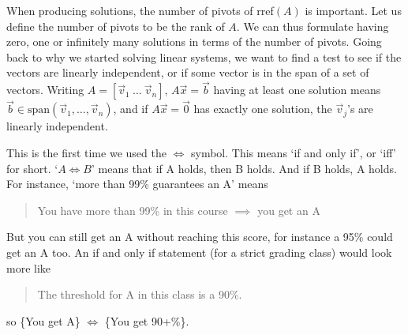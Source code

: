 When producing solutions, the number of pivots of rref$(A)$ is important. Let us define the number of pivots to be the rank of $A$. 
We can thus formulate having zero, one or infinitely many solutions in terms of the number of pivots.
Going back to why we started solving linear systems, we want to find a test to see if the vectors are linearly independent, or if some vector is in the span of a set of vectors.
Writing $A=[\vec{v}_1 \ \ldots \ \vec{v}_n]$, $A\vec{x}=\vec{b}$ having at least one solution means $\vec{b}\in\textrm{span}(\vec{v}_1,\ldots,\vec{v}_n)$,
and if $A\vec{x}=\vec{0}$ has exactly one solution, the $\vec{v}_j$'s are linearly independent.
\begin{remark}
	This is the first time we used the $\iff$ symbol. This means `if and only if', or `iff' for short.
	`$A\iff B$' means that if A holds, then B holds. And if B holds, A holds. 
	For instance, `more than 99\% guarantees an A' means \begin{quotation}
		You have more than 99\% in this course $\implies$ you get an A
	\end{quotation}
	But you can still get an A without reaching this score, for instance a 95\% could get an A too.
	An if and only if statement (for a strict grading class) would look more like \begin{quotation}
		The threshold for A in this class is a 90\%.
	\end{quotation}
	so \{You get A\} $\iff$ \{You get 90+\%\}.
\end{remark}
